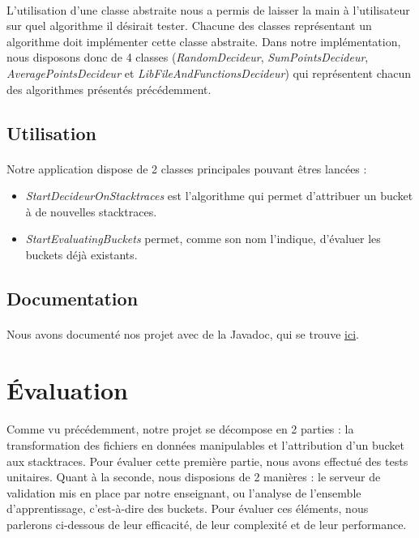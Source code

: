\documentclass{article}
\begin{document}
\paragraph{}
L'utilisation d'une classe abstraite nous a permis de laisser la main à l'utilisateur sur quel algorithme il désirait tester. Chacune des classes représentant un algorithme doit implémenter cette classe abstraite. Dans notre implémentation, nous disposons donc de 4 classes (\textit{RandomDecideur}, \textit{SumPointsDecideur}, \textit{AveragePointsDecideur} et \textit{LibFileAndFunctionsDecideur}) qui représentent chacun des algorithmes présentés précédemment.


\subsection{Utilisation}

\paragraph{}
Notre application dispose de 2 classes principales pouvant êtres lancées :

\begin{itemize}
\item \textit{StartDecideurOnStacktraces} est l'algorithme qui permet d'attribuer un bucket à de nouvelles stacktraces.
\item \textit{StartEvaluatingBuckets} permet, comme son nom l'indique, d'évaluer les buckets déjà existants.
\end{itemize}

\subsection{Documentation}

\paragraph{}
Nous avons documenté nos projet avec de la Javadoc, qui se trouve \href{http://documentationjava.alwaysdata.net/}{ici}.
\section{Évaluation}

\paragraph{}
Comme vu précédemment, notre projet se décompose en 2 parties : la transformation des fichiers en données manipulables et l'attribution d'un bucket aux stacktraces. Pour évaluer cette première partie, nous avons effectué des tests unitaires. Quant à la seconde, nous disposions de 2 manières : le serveur de validation mis en place par notre enseignant, ou l'analyse de l'ensemble d'apprentissage, c'est-à-dire des buckets. Pour évaluer ces éléments, nous parlerons ci-dessous de leur efficacité, de leur complexité et de leur performance.
\end{document}
